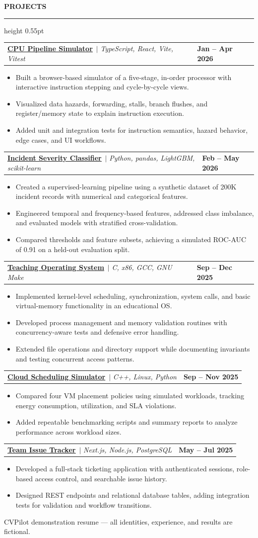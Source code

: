 \documentclass[10pt,letterpaper]{article}
\makeatletter
\newcommand{\ressection}[1]{%
  \vspace{1.8pt}%
  {\fontsize{11.1}{11.9}\selectfont\bfseries\MakeUppercase{#1}}\par
  \vspace{0.35pt}\hrule height 0.55pt\vspace{3.0pt}%
}
\newcommand{\projline}[4]{%
  {\fontsize{10.1}{11.25}\selectfont
  \begin{tabularx}{\textwidth}{@{}X >{\raggedleft\arraybackslash\bfseries}p{0.205\textwidth}@{}}
    {\href{#1}{\bfseries\underline{#2}}\, $|$ \textit{#3}} & #4
  \end{tabularx}}\vspace{-0.2pt}%
}
\newenvironment{resitems}{%
  \begin{itemize}[leftmargin=18pt,labelindent=0pt,labelsep=11.5pt,labelwidth=6pt,align=left,
                  itemsep=0.42pt,topsep=0.38pt,parsep=0pt,partopsep=0pt]
  \fontsize{10.05}{12.0}\selectfont\RaggedRight
}{\end{itemize}\vspace{0.48pt}}
\makeatother
\begin{document}
\ressection{Projects}
\projline{https://example.com/pipeline-simulator}{CPU Pipeline Simulator}{TypeScript, React, Vite, Vitest}{Jan -- Apr 2026}
\begin{resitems}
\item Built a browser-based simulator of a five-stage, in-order processor with interactive instruction stepping and cycle-by-cycle views.
\item Visualized data hazards, forwarding, stalls, branch flushes, and register/memory state to explain instruction execution.
\item Added unit and integration tests for instruction semantics, hazard behavior, edge cases, and UI workflows.
\end{resitems}
\projline{https://example.com/incident-classifier}{Incident Severity Classifier}{Python, pandas, LightGBM, scikit-learn}{Feb -- May 2026}
\begin{resitems}
\item Created a supervised-learning pipeline using a synthetic dataset of 200K incident records with numerical and categorical features.
\item Engineered temporal and frequency-based features, addressed class imbalance, and evaluated models with stratified cross-validation.
\item Compared thresholds and feature subsets, achieving a simulated ROC-AUC of 0.91 on a held-out evaluation split.
\end{resitems}
\projline{https://example.com/teaching-os}{Teaching Operating System}{C, x86, GCC, GNU Make}{Sep -- Dec 2025}
\begin{resitems}
\item Implemented kernel-level scheduling, synchronization, system calls, and basic virtual-memory functionality in an educational OS.
\item Developed process management and memory validation routines with concurrency-aware tests and defensive error handling.
\item Extended file operations and directory support while documenting invariants and testing concurrent access patterns.
\end{resitems}
\projline{https://example.com/cloud-scheduler}{Cloud Scheduling Simulator}{C++, Linux, Python}{Sep -- Nov 2025}
\begin{resitems}
\item Compared four VM placement policies using simulated workloads, tracking energy consumption, utilization, and SLA violations.
\item Added repeatable benchmarking scripts and summary reports to analyze performance across workload sizes.
\end{resitems}
\projline{https://example.com/issue-tracker}{Team Issue Tracker}{Next.js, Node.js, PostgreSQL}{May -- Jul 2025}
\begin{resitems}
\item Developed a full-stack ticketing application with authenticated sessions, role-based access control, and searchable issue history.
\item Designed REST endpoints and relational database tables, adding integration tests for validation and workflow transitions.
\end{resitems}

\vfill
{\centering\fontsize{7.5}{8.5}\selectfont\color{gray}CVPilot demonstration resume --- all identities, experience, and results are fictional.\par}
\end{document}
